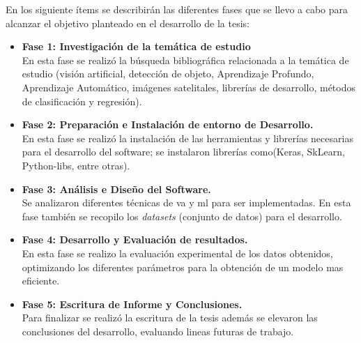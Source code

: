En los siguiente ítems se describirán las diferentes fases que se llevo a cabo para alcanzar el objetivo planteado en el desarrollo de la tesis:
\begin{itemize}
	\item \textbf{Fase 1: Investigación de la temática de estudio}\\
	En esta fase se realizó la búsqueda bibliográfica relacionada a la temática de estudio (visión artificial, detección de objeto, 
	Aprendizaje Profundo, Aprendizaje Automático, imágenes satelitales, librerías de desarrollo, métodos de clasificación y regresión).
	\item \textbf{Fase 2: Preparación e Instalación de entorno de Desarrollo.}\\
	En esta fase se realizó la instalación de las herramientas y librerías necesarias para el desarrollo del software; se instalaron librerías  
como(Keras, SkLearn, Python-libs, entre otras).
	\item \textbf{Fase 3: Análisis e Diseño del Software.}\\
	Se analizaron diferentes técnicas de \ac{va} y \ac{ml} para ser implementadas. En esta fase también se recopilo los \textit{datasets} (conjunto de datos) para el desarrollo.
	\item \textbf{Fase 4: Desarrollo y Evaluación de resultados.}\\
	En esta fase se realizo la evaluación experimental de los datos obtenidos, optimizando los diferentes parámetros para la obtención de un 
modelo mas eficiente.
	\item \textbf{Fase 5: Escritura de Informe y Conclusiones.}\\
	Para finalizar se realizó la escritura de la tesis además se elevaron las conclusiones del desarrollo, evaluando lineas futuras de trabajo.
\end{itemize}


